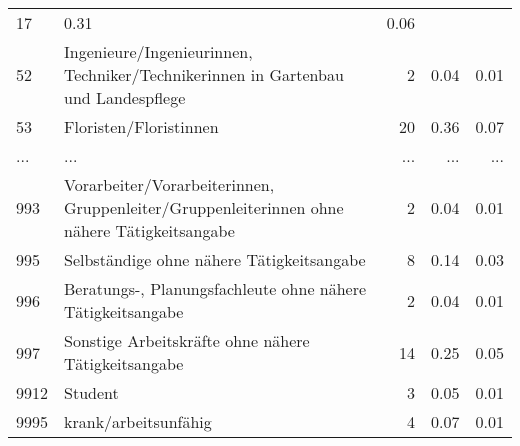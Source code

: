 \begin{longtable}{lXrrr}
          \num{17} &
          \num[round-mode=places,round-precision=2]{0,31} &
          \num[round-mode=places,round-precision=2]{0,06} \\
        52 & \multicolumn{1}{X}{Ingenieure/Ingenieurinnen, Techniker/Technikerinnen in Gartenbau und Landespflege} & %
          \num{2} &
          \num[round-mode=places,round-precision=2]{0,04} &
          \num[round-mode=places,round-precision=2]{0,01} \\
        53 & \multicolumn{1}{X}{Floristen/Floristinnen} & %
          \num{20} &
          \num[round-mode=places,round-precision=2]{0,36} &
          \num[round-mode=places,round-precision=2]{0,07} \\
       ... & ... & ... & ... & ... \\
        993 & \multicolumn{1}{X}{Vorarbeiter/Vorarbeiterinnen, Gruppenleiter/Gruppenleiterinnen ohne nähere Tätigkeitsangabe} & %
          \num{2} &
          \num[round-mode=places,round-precision=2]{0,04} &
          \num[round-mode=places,round-precision=2]{0,01} \\

        995 & \multicolumn{1}{X}{Selbständige ohne nähere Tätigkeitsangabe} & %
          \num{8} &
          \num[round-mode=places,round-precision=2]{0,14} &
          \num[round-mode=places,round-precision=2]{0,03} \\

        996 & \multicolumn{1}{X}{Beratungs-, Planungsfachleute ohne nähere Tätigkeitsangabe} & %
          \num{2} &
          \num[round-mode=places,round-precision=2]{0,04} &
          \num[round-mode=places,round-precision=2]{0,01} \\

        997 & \multicolumn{1}{X}{Sonstige Arbeitskräfte ohne nähere Tätigkeitsangabe} & %
          \num{14} &
          \num[round-mode=places,round-precision=2]{0,25} &
          \num[round-mode=places,round-precision=2]{0,05} \\

        9912 & \multicolumn{1}{X}{Student} & %
          \num{3} &
          \num[round-mode=places,round-precision=2]{0,05} &
          \num[round-mode=places,round-precision=2]{0,01} \\

        9995 & \multicolumn{1}{X}{krank/arbeitsunfähig} & %
          \num{4} &
          \num[round-mode=places,round-precision=2]{0,07} &
          \num[round-mode=places,round-precision=2]{0,01} \\


\end{longtable}
